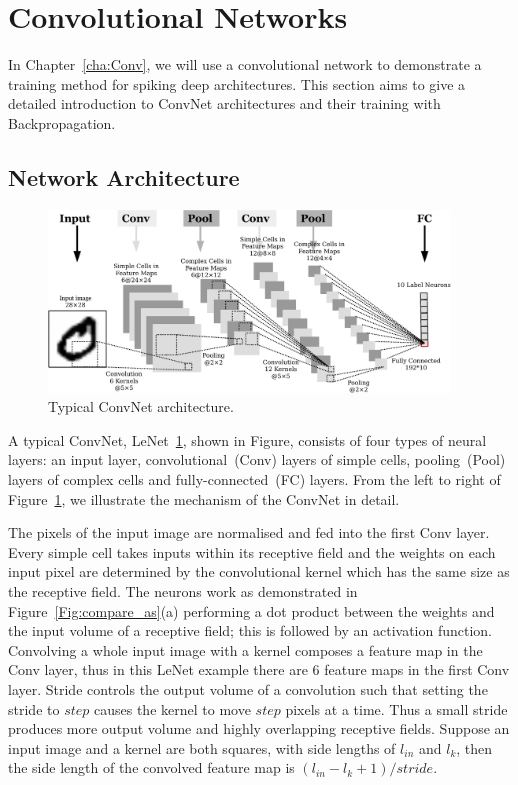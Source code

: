 \section{Convolutional Networks}
\label{sec:convnet}
In Chapter~\ref{cha:Conv}, we will use a convolutional network to demonstrate a training method for spiking deep architectures.
This section aims to give a detailed introduction to ConvNet architectures and their training with Backpropagation.
\subsection{Network Architecture}

	\begin{figure}[bt]
		\centering
		\includegraphics[width=0.95\textwidth]{pics_snn/convnet.pdf}
		\caption{Typical ConvNet architecture.}
		\label{Fig:ConvNet}
	\end{figure}

A typical ConvNet, LeNet~\ref{Fig:ConvNet}, shown in Figure, consists of four types of neural layers: an input layer, convolutional~(Conv) layers of simple cells, pooling~(Pool) layers of complex cells and fully-connected~(FC) layers.
From the left to right of Figure~\ref{Fig:ConvNet}, we illustrate the mechanism of the ConvNet in detail.

The pixels of the input image are normalised and fed into the first Conv layer.
Every simple cell takes inputs within its receptive field and the weights on each input pixel are determined by the convolutional kernel which has the same size as the receptive field.
The neurons work as demonstrated in Figure~\ref{Fig:compare_as}(a) performing a dot product between the weights and the input volume of a receptive field; this is followed by an activation function.
Convolving a whole input image with a kernel composes a feature map in the Conv layer, thus in this LeNet example there are 6 feature maps in the first Conv layer.
Stride controls the output volume of a convolution such that setting the stride to $step$ causes the kernel to move $step$ pixels at a time.
Thus a small stride produces more output volume and highly overlapping receptive fields.
Suppose an input image and a kernel are both squares, with side lengths of $l_{in}$ and $l_k$, then the side length of the convolved feature map is $(l_{in} - l_k + 1)/stride$.

